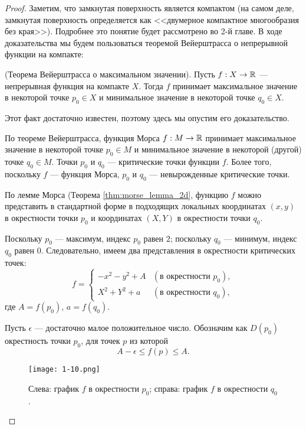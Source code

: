 \documentclass[a4paper,12pt,openany,leqno]{extbook}
\begin{document}
\begin{proof}
Заметим, что замкнутая поверхность является компактом (на самом деле, замкнутая поверхность определяется как <<двумерное компактное многообразия без края>>). Подробнее это понятие будет рассмотрено во 2-й главе. В ходе доказательства мы будем пользоваться теоремой Вейерштрасса о непрерывной функции на компакте:

\begin{theorem} (Теорема Вейерштрасса о максимальном значении). Пусть $f: X \to \mathbb{R}$ --- непрерывная функция на компакте $X$. Тогда $f$ принимает максимальное значение в некоторой точке $p_0 \in X$ и минимальное значение в некоторой точке $q_0 \in X$.
\end{theorem}

Этот факт достаточно известен, поэтому здесь мы опустим его доказательство.

По теореме Вейерштрасса, функция Морса $f:M\to \mathbb{R}$ принимает максимальное значение в некоторой точке $p_0 \in M$ и минимальное значение в некоторой (другой) точке $q_0 \in M$. Точки $p_0$ и $q_0$ --- критические точки функции $f$. Более того, поскольку $f$ --- функция Морса, $p_0$ и $q_0$ --- невырожденные критические точки.

По лемме Морса (Теорема \ref{thm:morse_lemma_2d}, функцию $f$ можно представить в стандартной форме в подходящих локальных координатах $(x, y)$ в окрестности точки $p_0$ и координатах $(X, Y)$ в окрестности точки $q_0$.

Поскольку $p_0$ --- максимум, индекс $p_0$ равен $2$; поскольку $q_0$ --- минимум, индекс $q_0$ равен $0$. Следовательно, имеем два представления в окрестности критических точек:
\begin{equation}
f =
\begin{cases}
-x^2 - y^2 + A & (\text{в окрестности }p_0),\\
X^2 + Y^2 + a & (\text{в окрестности }q_0),
\end{cases}
\label{eq:bowls}
\end{equation}
где $A = f(p_0)$, $a = f(q_0)$.

Пусть $\epsilon$ --- достаточно малое положительное число. Обозначим как $D(p_0)$ окрестность точки $p_0$, для точек $p$ из которой
\begin{equation}
A - \epsilon \leq f(p) \leq A.
\end{equation}

\begin{figure}[t]
\texttt{[image: 1-10.png]}
\caption{Слева: график $f$ в окрестности $p_0$; справа: график $f$ в окрестности $q_0$.}
\label{fig:bowls}
\end{figure}


\end{proof}
\end{document}
